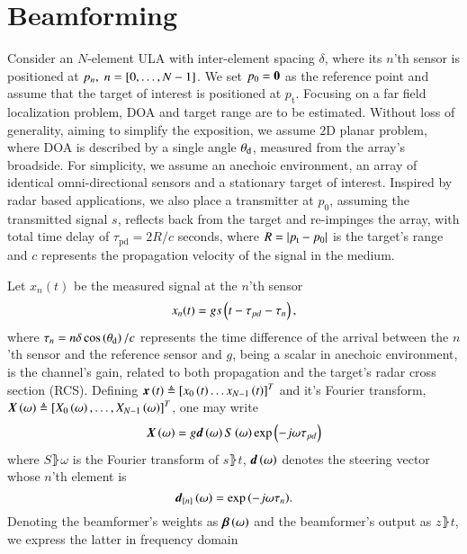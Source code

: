 \section{Beamforming}\label{sec:setup}
Consider an $N$-element ULA with inter-element spacing $\delta$, where its $n$'th sensor is positioned at $p_{n},\; n=\left[{0,\ldots,N-1}\right]$. We set $p_{0}=\boldsymbol{0}$ as the reference point and assume that the target of interest is positioned at $p_{\text{t}}$.
Focusing on a far field localization problem, DOA and target range are to be estimated. Without loss of generality, aiming to simplify the exposition, we assume $2\text{D}$ planar problem, where DOA is described by a single angle $\theta_{\text{d}}$, measured from the array's broadside.
For simplicity, we assume an anechoic environment, an array of identical omni-directional sensors and a stationary target of interest.
Inspired by radar based applications, we also place a transmitter at $p_{0}$, assuming the transmitted signal $s$, reflects back from the target and re-impinges the array, with total time delay of $\tau_{\text{pd}}=2R/c$ seconds, where $R = \left\vert p_{\text{t}}-p_{0}\right\vert$ is the target's range and $c$ represents the propagation velocity of the signal in the medium. 
\par Let $x_{n}(t)$ be the measured signal at the $n$'th sensor
\begin{equation}
x_{n}(t) = gs\Brack{t-\tau_{pd}-\tau_{n}},
\label{eqn:noFeedbackULA_singleSensor_temporal}
\end{equation}
where $\tau_{n}=n\delta\cos\left({\theta_{\text{d}}}\right)/c$ represents the time difference of the arrival between the $n$'th sensor and the reference sensor and $g$, being a scalar in anechoic environment, is the channel's gain, related to both propagation and the target's radar cross section (RCS).
Defining $\boldsymbol{x}\left({t}\right)\triangleq\left[{x_{0}\left({t}\right)\hdots{}x_{N-1}\left({t}\right)}\right]^{T}$ and it's Fourier transform, $\vecnot{\F{x}}\rBrace{\omega}\triangleq\vBrace{X_{0}\rBrace{\omega},\hdots,X_{N-1}\rBrace{\omega}}^{T}$, one may write 
\[
\vecnot{\F{x}}\rBrace{\omega}=g\vecnot{d}\rBrace{\omega}\F{s}\rBrace{\omega}\exp{\rBrace{-j\omega\tau_{pd}}}
\]
where $S\rBrace{\omega}$ is the Fourier transform of $s\rBrace{t}$, $\boldsymbol{d}\left({\omega}\right)$ denotes the steering vector whose $n$'th element is
\begin{equation}
    \label{eq:d}
    \vecnot{d}_{\vBrace{n}}\rBrace{\omega} = \exp{\rBrace{-j\omega\tau_{n}}}.
\end{equation}
Denoting the beamformer's weights as $\vBeta\rBrace{\omega}$ and the beamformer's output as $z\rBrace{t}$, we express the latter in frequency domain

